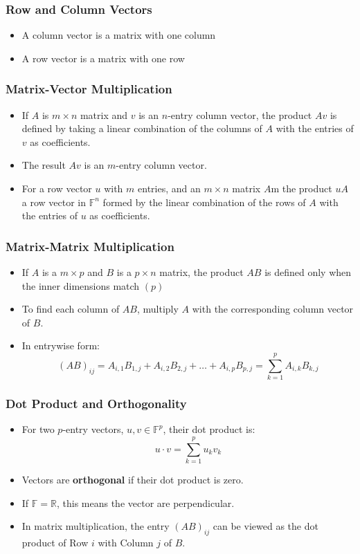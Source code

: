 \documentclass[a4paper, 9pt]{extarticle}
\begin{document}
\subsubsection{Row and Column Vectors}
\begin{itemize}
  \item A column vector is a matrix with one column
  \item A row vector is a matrix with one row
\end{itemize}
\subsubsection{Matrix-Vector Multiplication}
\begin{itemize}
  \item If $A$ is $m \times n$ matrix and $v$ is an $n$-entry column vector, the product $Av$ is defined by taking a linear combination of the columns of $A$ with the entries of $v$ as coefficients.
  \item The result $Av$ is an $m$-entry column vector.
  \item For a row vector $u$ with $m$ entries, and an $m \times n$ matrix $A$m the product $uA$ a row vector in $\mathbb{F}^n$ formed by the linear combination of the rows of $A$ with the entries of $u$ as coefficients.
\end{itemize}
\subsubsection{Matrix-Matrix Multiplication}
\begin{itemize}
  \item If $A$ is a $m \times p$ and $B$ is a $p \times n$ matrix, the product $AB$ is defined only when the inner dimensions match $(p)$
  \item To find each column of $AB$, multiply $A$ with the corresponding column vector of $B$.
  \item In entrywise form:
        $$
          (AB)_{ij} = A_{i,1}B_{1,j} + A_{i,2}B_{2,j} + \ldots + A_{i,p}B_{p,j} = \sum_{k=1}^p A_{i,k}B_{k,j}
        $$
\end{itemize}

\subsubsection{Dot Product and Orthogonality}
\begin{itemize}
  \item For two $p$-entry vectors, $u, v \in \mathbb{F}^p$, their dot product is:
        $$u \cdot v = \sum_{k=1}^p u_k v_k$$
  \item Vectors are \textbf{orthogonal} if their dot product is zero.
  \item If $\mathbb{F} = \mathbb{R}$, this means the vector are perpendicular.
  \item In matrix multiplication, the entry $(AB)_{ij}$ can be viewed as the dot product of Row $i$ with Column $j$ of $B$.
\end{itemize}
\end{document}
